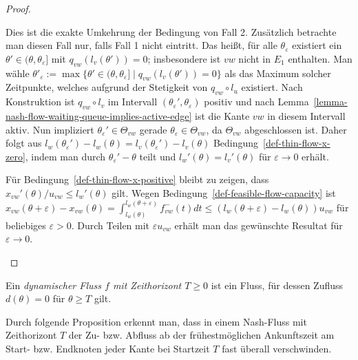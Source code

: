 \begin{proof}
\begin{description}[leftmargin=0cm, topsep=0cm, itemindent=0.5cm]
		Dies ist die exakte Umkehrung der Bedingung von Fall 2.
		Zusätzlich betrachte man diesen Fall nur, falls Fall 1 nicht eintritt.
		Das heißt, für alle $\theta_\varepsilon$ existiert ein $\theta'\in(\theta, \theta_\varepsilon]$ mit $q_{vw}(l_v(\theta')) = 0$; insbesondere ist $vw$ nicht in $E_1$ enthalten.
		Man wähle $\theta'_\varepsilon:=\max\{ \theta'\in (\theta, \theta_\varepsilon] \mid q_{vw}(l_v(\theta')) = 0 \}$ als das Maximum solcher Zeitpunkte, welches aufgrund der Stetigkeit von $q_{vw}\circ l_u$ existiert.
		Nach Konstruktion ist $q_{vw}\circ l_v$ im Intervall $(\theta_\varepsilon', \theta_\varepsilon)$ positiv und nach Lemma~\ref{lemma-nash-flow-waiting-queue-implies-active-edge} ist die Kante $vw$ in diesem Intervall aktiv.
		Nun impliziert $\theta_\varepsilon'\in \Theta_{vw}$ gerade $\theta_\varepsilon\in\Theta_{vw}$, da $\Theta_{vw}$ ab\-ge\-schlossen ist.
		Daher folgt aus $l_w(\theta_\varepsilon') - l_w(\theta) = l_v(\theta_\varepsilon') - l_v(\theta)$ 		Bedingung~\ref{def-thin-flow-x-zero}, indem man durch $\theta_\varepsilon'-\theta$ teilt und $l_w'(\theta) = l_v'(\theta)$ für $\varepsilon\rightarrow0$ erhält.
		
		Für Bedingung~\ref{def-thin-flow-x-positive} bleibt zu zeigen, dass $x_{vw}'(\theta) /u_{vw}\leq l_w'(\theta)$ gilt.
		Wegen Bedingung~\ref{def-feasible-flow-capacity} ist $x_{vw}(\theta + \varepsilon)-x_{vw}(\theta) = \int_{l_w(\theta)}^{l_w(\theta+\varepsilon)} f_{vw}^-(t) dt\leq (l_w(\theta + \varepsilon) - l_w(\theta)) u_{vw}$ für beliebiges $\varepsilon>0$.
		Durch Teilen mit $\varepsilon u_{vw}$ erhält man das gewünschte Resultat für $\varepsilon\rightarrow 0$.
	\end{description}
\end{proof}

\begin{definition}
	Ein \emph{dynamischer Fluss $f$ mit Zeithorizont $T\geq0$} ist ein Fluss, für dessen Zufluss $d(\theta)= 0$ für $\theta\geq T$ gilt.
\end{definition}

Durch folgende Proposition erkennt man, dass in einem Nash-Fluss mit Zeithorizont $T$ der Zu- bzw. Abfluss ab der frühestmöglichen Ankunftszeit am Start- bzw. Endknoten jeder Kante bei Startzeit $T$ fast überall verschwinden.

